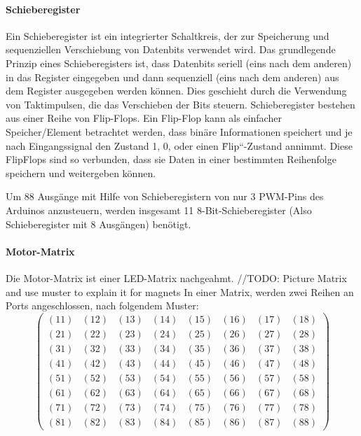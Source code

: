 \paragraph{Schieberegister}
Ein Schieberegister ist ein integrierter Schaltkreis, der zur Speicherung und sequenziellen Verschiebung von
Datenbits verwendet wird.\newline
Das grundlegende Prinzip eines Schieberegisters ist, dass Datenbits seriell (eins nach dem anderen) in das Register
eingegeben und dann sequenziell (eins nach dem anderen) aus dem Register ausgegeben werden können. Dies geschieht durch
die Verwendung von Taktimpulsen, die das Verschieben der Bits steuern.\newline
Schieberegister bestehen aus einer Reihe von Flip-Flops. Ein Flip-Flop kann als einfacher Speicher/Element betrachtet werden, dass
binäre Informationen speichert und je nach Eingangssignal den Zustand 1, 0, oder einen \"Flip``-Zustand annimmt. Diese
FlipFlops sind so verbunden, dass sie Daten in einer bestimmten Reihenfolge speichern und weitergeben können. \newline

Um 88 Ausgänge mit Hilfe von Schieberegistern von nur 3 PWM-Pins des Arduinos anzusteuern, werden insgesamt 11 8-Bit-Schieberegister
(Also Schieberegister mit 8 Ausgängen) benötigt.

\paragraph{Motor-Matrix}
Die Motor-Matrix ist einer LED-Matrix nachgeahmt. //TODO: Picture Matrix and use muster to explain it for magnets
In einer Matrix, werden zwei Reihen an Ports angeschlossen, nach folgendem Muster:
$$
\begin{pmatrix}
	(11) & (12) & (13) & (14) & (15) & (16) & (17) & (18) \\
	(21) & (22) & (23) & (24) & (25) & (26) & (27) & (28) \\
	(31) & (32) & (33) & (34) & (35) & (36) & (37) & (38) \\
	(41) & (42) & (43) & (44) & (45) & (46) & (47) & (48) \\
	(51) & (52) & (53) & (54) & (55) & (56) & (57) & (58) \\
	(61) & (62) & (63) & (64) & (65) & (66) & (67) & (68) \\
	(71) & (72) & (73) & (74) & (75) & (76) & (77) & (78) \\
	(81) & (82) & (83) & (84) & (85) & (86) & (87) & (88)
\end{pmatrix}
$$


